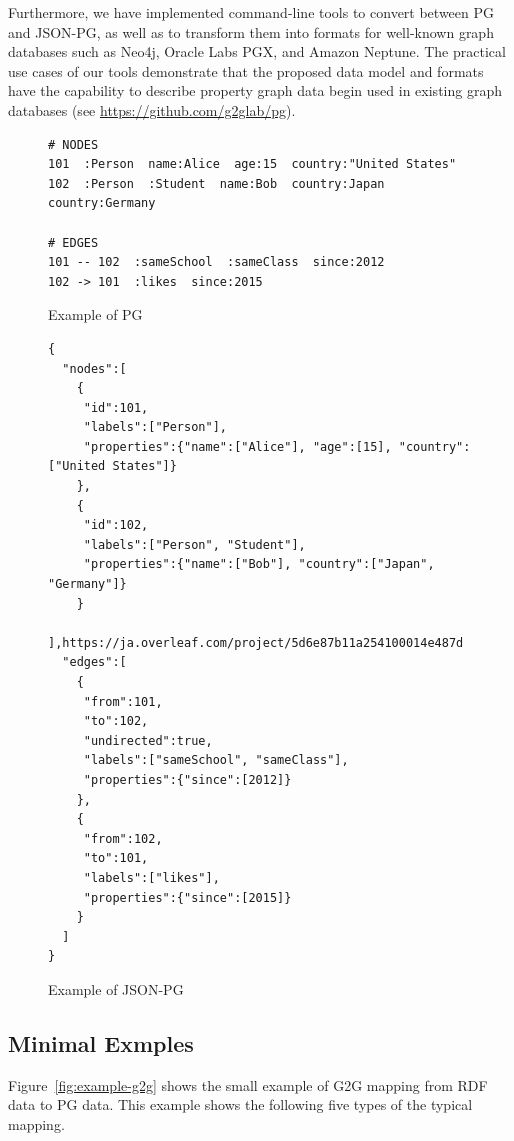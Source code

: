 \documentclass[runningheads]{llncs}
\begin{document}
Furthermore, we have implemented command-line tools to convert between PG and JSON-PG, as well as to transform them into formats for well-known graph databases such as Neo4j, Oracle Labs PGX, and Amazon Neptune. The practical use cases of our tools demonstrate that the proposed data model and formats have the capability to describe property graph data begin used in existing graph databases (see \url{https://github.com/g2glab/pg}).

\begin{figure}[!t]
\begin{scriptsize}
\begin{verbatim}
# NODES
101  :Person  name:Alice  age:15  country:"United States"
102  :Person  :Student  name:Bob  country:Japan  country:Germany

# EDGES
101 -- 102  :sameSchool  :sameClass  since:2012
102 -> 101  :likes  since:2015
\end{verbatim}
\end{scriptsize}
\caption{Example of PG}
\label{fig:example-pg}
\end{figure}

\begin{figure}[!t]
\begin{scriptsize}
\begin{verbatim}
{
  "nodes":[
    {
     "id":101,
     "labels":["Person"],
     "properties":{"name":["Alice"], "age":[15], "country":["United States"]}
    },
    {
     "id":102,
     "labels":["Person", "Student"],
     "properties":{"name":["Bob"], "country":["Japan", "Germany"]}
    }
  ],https://ja.overleaf.com/project/5d6e87b11a254100014e487d
  "edges":[
    {
     "from":101,
     "to":102,
     "undirected":true,
     "labels":["sameSchool", "sameClass"],
     "properties":{"since":[2012]}
    },
    {
     "from":102,
     "to":101,
     "labels":["likes"],
     "properties":{"since":[2015]}
    }
  ]
}
\end{verbatim}
\end{scriptsize}
\caption{Example of JSON-PG}
\label{fig:example-json}
\end{figure}

\subsection{Minimal Exmples}
Figure~\ref{fig:example-g2g} shows the small example of G2G mapping from RDF data to PG data. This example shows the following five types of the typical mapping.
\end{document}
